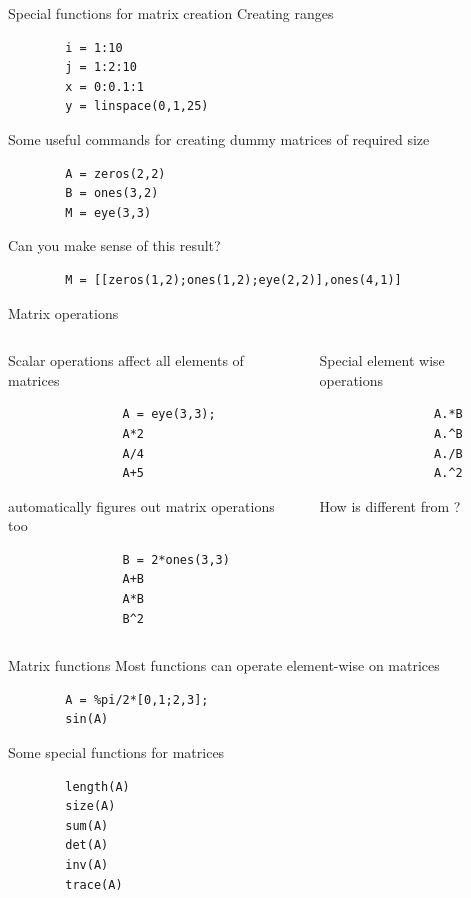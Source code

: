 \begin{frame}[fragile]{Special functions for matrix creation}
    Creating ranges
    \begin{lstlisting}
        i = 1:10
        j = 1:2:10
        x = 0:0.1:1
        y = linspace(0,1,25)
    \end{lstlisting}
    Some useful commands for creating dummy matrices of required size
    \begin{lstlisting}
        A = zeros(2,2)
        B = ones(3,2)
        M = eye(3,3)
    \end{lstlisting}
    Can you make sense of this result?
    \begin{lstlisting}
        M = [[zeros(1,2);ones(1,2);eye(2,2)],ones(4,1)]
    \end{lstlisting}
\end{frame}

\begin{frame}[fragile]{Matrix operations}
    \begin{columns}
        \begin{column}{0.49\linewidth}
            Scalar operations affect all elements of matrices
            \begin{lstlisting}
                A = eye(3,3);
                A*2
                A/4
                A+5
            \end{lstlisting}
            \scilab{} automatically figures out matrix operations too
            \begin{lstlisting}
                B = 2*ones(3,3)
                A+B
                A*B
                B^2
            \end{lstlisting}
        \end{column}
        \begin{column}{0.49\linewidth}
            Special element wise operations
            \begin{lstlisting}
                A.*B
                A.^B
                A./B
                A.^2
            \end{lstlisting}
            How is  different from ?
        \end{column}
    \end{columns}
\end{frame}

\begin{frame}[fragile]{Matrix functions}
    Most \scilab{} functions can operate element-wise on matrices
    \begin{lstlisting}
        A = %pi/2*[0,1;2,3];
        sin(A)
    \end{lstlisting}
    Some special functions for matrices
    \begin{lstlisting}
        length(A)
        size(A)
        sum(A)
        det(A)
        inv(A)
        trace(A)
    \end{lstlisting}
\end{frame}

